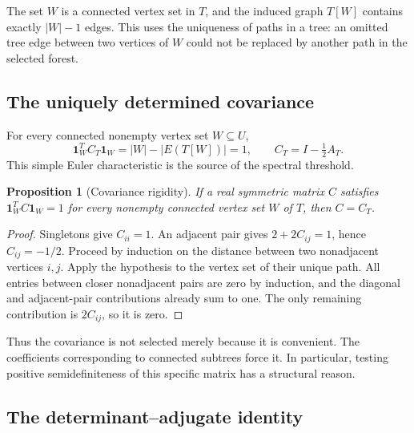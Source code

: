 \documentclass[11pt]{article}
\numberwithin{equation}{section}
\newtheorem{proposition}[theorem]{Proposition}
\theoremstyle{definition}
\newcommand{\one}{\mathbf 1}
\begin{document}
The set $W$ is a connected vertex set in $T$, and the induced graph
$T[W]$ contains exactly $|W|-1$ edges.  This uses the uniqueness of paths
in a tree: an omitted tree edge between two vertices of $W$ could not be
replaced by another path in the selected forest.

\subsection{The uniquely determined covariance}

For every connected nonempty vertex set $W\subseteq U$,
\begin{equation}
 \one_W^T C_T\one_W
 =|W|-|E(T[W])|=1,
 \qquad C_T=I-\tfrac12 A_T.
 \label{ade:eq:connectedenergy}
\end{equation}
This simple Euler characteristic is the source of the spectral threshold.

\begin{proposition}[Covariance rigidity]
\label{ade:prop:uniqueC}
If a real symmetric matrix $C$ satisfies
$\one_W^TC\one_W=1$ for every nonempty connected vertex set $W$ of $T$,
then $C=C_T$.
\end{proposition}
\begin{proof}
Singletons give $C_{ii}=1$.  An adjacent pair gives
$2+2C_{ij}=1$, hence $C_{ij}=-1/2$.
Proceed by induction on the distance between two nonadjacent vertices
$i,j$.  Apply the hypothesis to the vertex set of their unique path.
All entries between closer nonadjacent pairs are zero by induction, and
the diagonal and adjacent-pair contributions already sum to one.
The only remaining contribution is $2C_{ij}$, so it is zero.
\end{proof}

Thus the covariance is not selected merely because it is convenient.
The coefficients corresponding to connected subtrees force it.  In
particular, testing positive semidefiniteness of this specific matrix has
a structural reason.

\subsection{The determinant--adjugate identity}
\end{document}
